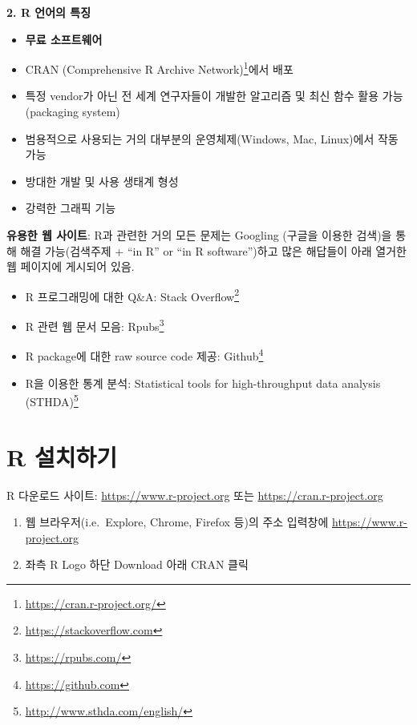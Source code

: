 \documentclass[
  11pt,
]{krantz}
\makeatletter
\providecommand{\tightlist}{%
  \setlength{\itemsep}{0pt}\setlength{\parskip}{0pt}}
\renewcommand{\href}[2]{#2\footnote{\url{#1}}}
\newenvironment{kframe}{%
\medskip{}
\setlength{\fboxsep}{.8em}
 \def\at@end@of@kframe{}%
 \ifinner\ifhmode%
  \def\at@end@of@kframe{\end{minipage}}%
  \begin{minipage}{\columnwidth}%
 \fi\fi%
 \def\FrameCommand##1{\hskip\@totalleftmargin \hskip-\fboxsep
 \colorbox{shadecolor}{##1}\hskip-\fboxsep
     \hskip-\linewidth \hskip-\@totalleftmargin \hskip\columnwidth}%
 \MakeFramed {\advance\hsize-\width
   \@totalleftmargin\z@ \linewidth\hsize
   \@setminipage}}%
 {\par\unskip\endMakeFramed%
 \at@end@of@kframe}
\newenvironment{rmdblock}[1]
  {
  \begin{itemize}
  \renewcommand{\labelitemi}{
    \raisebox{-.7\height}[0pt][0pt]{
      {\setkeys{Gin}{width=3em,keepaspectratio}\texttt{[image: images/\#1]}}
    }
  }
  \setlength{\fboxsep}{1em}
  \begin{kframe}
  \item
  }
  {
  \end{kframe}
  \end{itemize}
  }
\newenvironment{rmdtip}
  {\begin{rmdblock}{tip}}
  {\end{rmdblock}}
\makeatother
\begin{document}
\textbf{2. R 언어의 특징}

\begin{itemize}
\tightlist
\item
  \textbf{무료 소프트웨어}
\item
  \href{https://cran.r-project.org/}{CRAN (Comprehensive R Archive Network)}에서 배포
\item
  특정 vendor가 아닌 전 세계 연구자들이 개발한 알고리즘 및 최신 함수 활용 가능(packaging system)
\item
  범용적으로 사용되는 거의 대부분의 운영체제(Windows, Mac, Linux)에서 작동 가능
\item
  방대한 개발 및 사용 생태계 형성
\item
  강력한 그래픽 기능
\end{itemize}

\footnotesize

\begin{rmdtip}
\textbf{유용한 웹 사이트}: R과 관련한 거의 모든 문제는 Googling (구글을 이용한 검색)을 통해 해결 가능(검색주제 + ``in R'' or ``in R software'')하고 많은 해답들이 아래 열거한 웹 페이지에 게시되어 있음.

\begin{itemize}
\tightlist
\item
  R 프로그래밍에 대한 Q\&A: \href{https://stackoverflow.com}{Stack Overflow}
\item
  R 관련 웹 문서 모음: \href{https://rpubs.com/}{Rpubs}
\item
  R package에 대한 raw source code 제공: \href{https://github.com}{Github}
\item
  R을 이용한 통계 분석: \href{http://www.sthda.com/english/}{Statistical tools for high-throughput data analysis (STHDA)}
\end{itemize}
\end{rmdtip}

\normalsize

\hypertarget{installation}{%
\section{R 설치하기}\label{installation}}

R 다운로드 사이트: \url{https://www.r-project.org} 또는 \url{https://cran.r-project.org}

\begin{enumerate}
\def\labelenumi{\arabic{enumi}.}
\item
  웹 브라우저(i.e.~Explore, Chrome, Firefox 등)의 주소 입력창에 \url{https://www.r-project.org}
\item
  좌측 R Logo 하단 Download 아래 CRAN 클릭
\end{enumerate}
\end{document}
